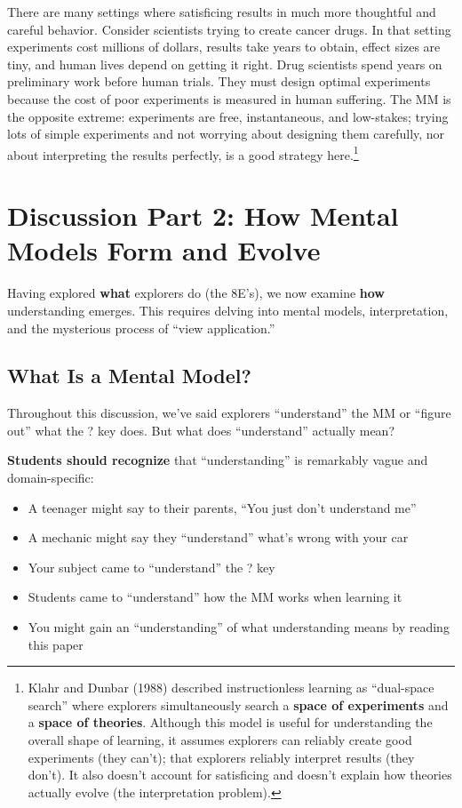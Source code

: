 \documentclass[12pt,letterpaper]{article}
\begin{document}
There are many settings where satisficing results in much more thoughtful and careful behavior. Consider scientists trying to create cancer drugs. In that setting experiments cost millions of dollars, results take years to obtain, effect sizes are tiny, and human lives depend on getting it right. Drug scientists spend years on preliminary work before human trials. They must design optimal experiments because the cost of poor experiments is measured in human suffering. The MM is the opposite extreme: experiments are free, instantaneous, and low-stakes; trying lots of simple experiments and not worrying about designing them carefully, nor about interpreting the results perfectly, is a good strategy here.\footnote{Klahr and Dunbar (1988) described instructionless learning as ``dual-space search'' where explorers simultaneously search a \textbf{space of experiments} and a \textbf{space of theories}. Although this model is useful for understanding the overall shape of learning, it assumes explorers can reliably create good experiments (they can't); that explorers reliably interpret results (they don't). It also doesn't account for satisficing and doesn't explain how theories actually evolve (the interpretation problem).}

\section{Discussion Part 2: How Mental Models Form and Evolve}

Having explored \textbf{what} explorers do (the 8E's), we now examine \textbf{how} understanding emerges. This requires delving into mental models, interpretation, and the mysterious process of ``view application.''

\subsection{What Is a Mental Model?}

Throughout this discussion, we've said explorers ``understand'' the MM or ``figure out'' what the ? key does. But what does ``understand'' actually mean?

\textbf{Students should recognize} that ``understanding'' is remarkably vague and domain-specific:

\begin{itemize}
\item A teenager might say to their parents, ``You just don't understand me''
\item A mechanic might say they ``understand'' what's wrong with your car
\item Your subject came to ``understand'' the ? key
\item Students came to ``understand'' how the MM works when learning it
\item You might gain an ``understanding'' of what understanding means by reading this paper
\end{itemize}
\end{document}
